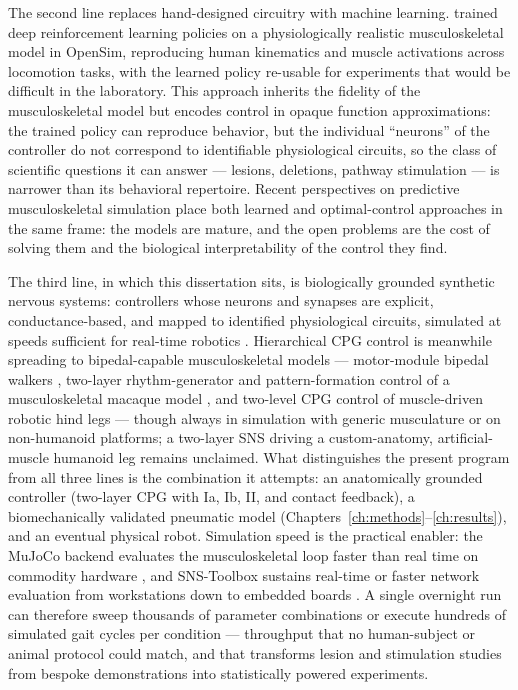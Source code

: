 The second line replaces hand-designed circuitry with machine learning. \citet{song_deep_2021} trained deep reinforcement learning policies on a physiologically realistic musculoskeletal model in OpenSim, reproducing human kinematics and muscle activations across locomotion tasks, with the learned policy re-usable for experiments that would be difficult in the laboratory. This approach inherits the fidelity of the musculoskeletal model but encodes control in opaque function approximations: the trained policy can reproduce behavior, but the individual ``neurons'' of the controller do not correspond to identifiable physiological circuits, so the class of scientific questions it can answer --- lesions, deletions, pathway stimulation --- is narrower than its behavioral repertoire. Recent perspectives on predictive musculoskeletal simulation \citep{degroote_perspective_2021} place both learned and optimal-control approaches in the same frame: the models are mature, and the open problems are the cost of solving them and the biological interpretability of the control they find.

The third line, in which this dissertation sits, is biologically grounded synthetic nervous systems: controllers whose neurons and synapses are explicit, conductance-based, and mapped to identified physiological circuits, simulated at speeds sufficient for real-time robotics \citep{nourse_sns_2023}. Hierarchical CPG control is meanwhile spreading to bipedal-capable musculoskeletal models --- motor-module bipedal walkers \citep{ichimura_pathological_2019}, two-layer rhythm-generator and pattern-formation control of a musculoskeletal macaque model \citep{nishizaki_gait_2026}, and two-level CPG control of muscle-driven robotic hind legs \citep{fukuoka_autonomous_2021} --- though always in simulation with generic musculature or on non-humanoid platforms; a two-layer SNS driving a custom-anatomy, artificial-muscle humanoid leg remains unclaimed. What distinguishes the present program from all three lines is the combination it attempts: an anatomically grounded controller (two-layer CPG with Ia, Ib, II, and contact feedback), a biomechanically validated pneumatic model (Chapters~\ref{ch:methods}--\ref{ch:results}), and an eventual physical robot. Simulation speed is the practical enabler: the MuJoCo backend evaluates the musculoskeletal loop faster than real time on commodity hardware \citep{todorov_mujoco_2012, caggiano_myosuite_2022}, and SNS-Toolbox sustains real-time or faster network evaluation from workstations down to embedded boards \citep{nourse_sns_2023}. A single overnight run can therefore sweep thousands of parameter combinations or execute hundreds of simulated gait cycles per condition --- throughput that no human-subject or animal protocol could match, and that transforms lesion and stimulation studies from bespoke demonstrations into statistically powered experiments.

